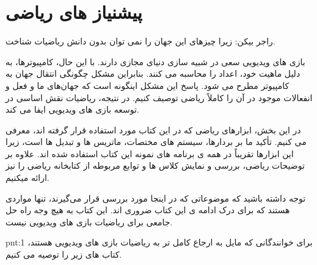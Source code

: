 
\newpage

\part{پیشنیاز های ریاضی}
{
    \Large
    \begin{spacing}{1.4}
        \textbf{\vspace{3pt}}
        \begin{displayquote}
            راجر بیکن: زیرا چیزهای این جهان را نمی توان بدون دانش ریاضیات شناخت.
            \begin{flushleft}
            \end{flushleft}
        \end{displayquote}
        \textbf{\vspace{3pt}}

        بازی های ویدیویی سعی در شبیه سازی دنیای مجازی دارند.
        با این حال، کامپیوترها، به دلیل ماهیت خود، اعداد را محاسبه می کنند. بنابراین مشکل چگونگی انتقال جهان به کامپیوتر مطرح می شود.
        پاسخ این مشکل اینگونه است که جهان‌های ما و فعل و انفعالات موجود در آن را کاملاً ریاضی توصیف کنیم.
        در نتیجه، ریاضیات نقش اساسی در توسعه بازی های ویدیویی ایفا می کند.

        در این بخش، ابزارهای ریاضی که در این کتاب مورد استفاده قرار گرفته اند، معرفی می کنیم. تأکید ما بر بردارها، سیستم های مختصات، ماتریس ها و تبدیل ها است، زیرا این ابزارها تقریباً در همه ی برنامه های نمونه این کتاب استفاده شده اند.
        علاوه بر توضیحات ریاضی، بررسی و نمایش کلاس ها و توابع مربوطه از کتابخانه ریاضی  را نیز ارائه میکنیم.

        توجه داشته باشید که موضوعاتی که در اینجا مورد بررسی قرار می‌گیرند، تنها مواردی هستند که برای درک ادامه ی این کتاب ضروری اند.
        این کتاب به هیچ وجه راه حل جامعی برای ریاضیات بازی های ویدیویی نیست.

        \begin{point}{pnt:1}
            \Large
            برای خوانندگانی که مایل به ارجاع کامل تر به ریاضیات بازی های ویدیویی هستند، کتاب های زیر را توصیه می کنیم.
            \textbf{\vspace{-20pt}}
        \end{point}


\end{spacing}}
